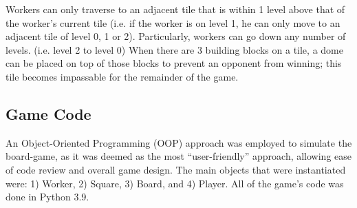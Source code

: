 \documentclass[a4paper,12pt,table]{article}
\begin{document}
Workers can only traverse to an adjacent tile that is within 1 level above that of the worker’s current tile (i.e. if the worker is on level 1, he can only move to an adjacent tile of level 0, 1 or 2). Particularly, workers can go down any number of levels. (i.e. level 2 to level 0) When there are 3 building blocks on a tile, a dome can be placed on top of those blocks to prevent an opponent from winning; this tile becomes impassable for the remainder of the game. \par

\subsection{Game Code}

An Object-Oriented Programming (OOP) approach was employed to simulate the board-game, as it was deemed as the most “user-friendly” approach, allowing ease of code review and overall game design. The main objects that were instantiated were: 1) Worker, 2) Square, 3) Board, and 4) Player. All of the game’s code was done in Python 3.9. \par
\end{document}
